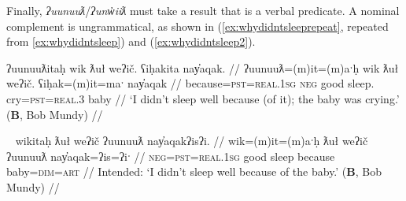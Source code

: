 
Finally, \textit{ʔuunuuƛ}/\textit{ʔunw̓iiƛ} must take a result that is a verbal predicate. A nominal complement is ungrammatical, as shown in (\ref{ex:whydidntsleeprepeat}, repeated from \ref{ex:whydidntsleep}) and (\ref{ex:whydidntsleep2}).

\ex \label{ex:whydidntsleeprepeat}
\begingl
\glpreamble ʔuunuuƛitaḥ wik ƛuł weʔič. ʕiḥakita nay̓aqak. //
\gla ʔuunuuƛ=(m)it=(m)aˑḥ wik ƛuł weʔič. ʕiḥak=(m)it=maˑ nay̓aqak //
\glb because=\textsc{pst}=\textsc{real.1sg} \textsc{neg} good sleep. cry=\textsc{pst}=\textsc{real.3} baby //
\glft `I didn't sleep well because (of it); the baby was crying.' (\textbf{B}, Bob Mundy) //
\endgl
\xe

\ex~ \label{ex:whydidntsleep2}
\begingl
\glpreamble *wikitaḥ ƛuł weʔič ʔuunuuƛ nay̓aqakʔisʔi. //
\gla wik=(m)it=(m)aˑḥ ƛuł weʔič ʔuunuuƛ nay̓aqak=ʔis=ʔiˑ //
\glb \textsc{neg}=\textsc{pst}=\textsc{real.1sg} good sleep because baby=\textsc{dim}=\textsc{art} //
\glft Intended: `I didn't sleep well because of the baby.' (\textbf{B}, Bob Mundy) //
\endgl
\xe

\begin{comment}
\ex~ \label{ex:uunuutl4}
\begingl
\glpreamble *hitaʔapweʔin kaatkimqsuptaał t̓an̓eʔisʔi ʔuunuuƛ našuk. //
\gla hitaʔap=weˑʔin kaatkimqsuptaał t̓an̓a=ʔis=ʔiˑ ʔuunuuƛ našuk //
\glb win=\textsc{hrsy.3} race child=\textsc{dim}=\textsc{art} because strong //
\glft Intended: `The kid won the race because he is strong.' (\textbf{B}, Bob Mundy) //
\endgl
\xe

\vspace{5pt}
\end{comment}

\begin{comment}
Becausitives also follow the typical verbal pattern of being able to freely drop arguments, already seen in (\ref{ex:uunuutl1}) and again in (\ref{ex:becausechanged}).

\vspace{5pt}

Context for (\ref{ex:becausechanged}): A retelling of traditional ways of life. This followed an explanation of how this isn't done anymore, and a lengthy pause.

\ex~ \label{ex:becausechanged}
\begingl
\glpreamble ʔunʔuuƛ̓aƛʔał kʷiisḥin. //
\gla ʔunʔuuƛ=!aƛ=ʔał kʷis-L.ḥin //
\glb because=\textsc{now}=\textsc{pl} different-\textsc{dr} //
\glft `Because they're different now.' (\textbf{C}, \textit{tupaat} Julia Lucas) //
\endgl
\xe
\end{comment}

